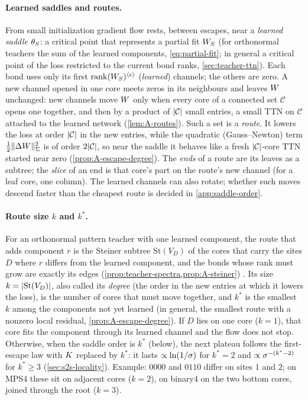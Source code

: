 \paragraph{Learned saddles and routes.}
From small initialization gradient flow rests, between escapes, near a \emph{learned saddle}
$\theta_S$: a critical point that represents a partial fit $W_S$ (for orthonormal teachers the sum
of the learned components, \eqref{eq:partial-fit}; in general a critical point of the loss restricted to
the current bond ranks, \cref{sec:teacher-ttn}). Each bond uses only its first $\operatorname{rank}(W_S)^{\langle e\rangle}$ (\emph{learned}) channels;
the others are zero. A new channel opened in one core meets zeros in its neighbours and leaves $W$
unchanged: new channels move $W$ only when every core of a connected set $\mathcal C$ opens one together, and
then by a product of $\lvert\mathcal C\rvert$ small entries, a small TTN on $\mathcal C$ attached to the learned network
(\cref{lem:A-routes}). Such a set is a \emph{route}. It lowers the loss at order $\lvert\mathcal C\rvert$ in the new
entries, while the quadratic (Gauss--Newton) term $\frac12\lVert\Delta W\rVert_{\Sigma}^2$ is of order $2\lvert\mathcal C\rvert$,
so near the saddle it behaves like a fresh $\lvert\mathcal C\rvert$-core TTN started near zero
(\cref{prop:A-escape-degree}). The \emph{ends} of a route are its leaves as a subtree; the
\emph{slice} of an end is that core's part on the route's new channel (for a leaf core, one column).
The learned channels can also rotate; whether such moves descend faster than the cheapest route is
decided in \cref{app:saddle-order}.

\paragraph{Route size $k$ and $k^*$.}
For an orthonormal pattern teacher with one learned component, the route that adds component $r$ is
the Steiner subtree $\mathrm{St}(V_D)$ of the cores that carry the sites $D$ where $r$ differs from the
learned component, and the bonds whose rank must grow are exactly its edges
(\cref{prop:teacher-spectra,prop:A-steiner}) \proven. Its size $k=\lvert\mathrm{St}(V_D)\rvert$, also called its
\emph{degree} (the order in the new entries at which it lowers the loss), is the number of
cores that must move together, and $k^*$ is the smallest $k$ among the components not yet learned (in
general, the smallest route with a nonzero local residual, \cref{prop:A-escape-degree}). If $D$ lies on
one core ($k=1$), that core fits the component through its learned channel and the flow does not stop.
Otherwise, when the saddle order is $k^*$ (below), the next plateau follows the first-escape law
with $K$ replaced by $k^*$: it lasts $\propto\ln(1/\sigma)$ for $k^*=2$ and $\propto\sigma^{-(k^*-2)}$ for
$k^*\ge3$ \derived{} (\cref{sec:s2s-locality}). Example: $0000$ and $0110$ differ on sites $1$ and $2$; on MPS4 these sit
on adjacent cores ($k=2$), on binary4 on the two bottom cores, joined through the root ($k=3$).

